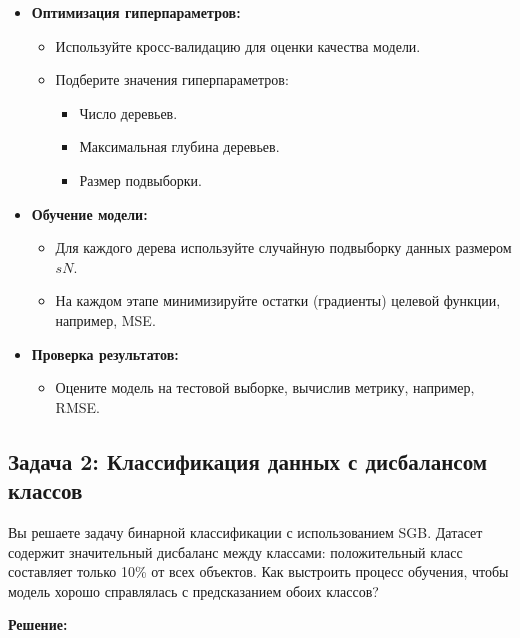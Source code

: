 \begin{itemize}
    \item \textbf{Оптимизация гиперпараметров:}
    \begin{itemize}
        \item Используйте кросс-валидацию для оценки качества модели.
        \item Подберите значения гиперпараметров:
        \begin{itemize}
            \item Число деревьев.
            \item Максимальная глубина деревьев.
            \item Размер подвыборки.
        \end{itemize}
    \end{itemize}
    \item \textbf{Обучение модели:}
    \begin{itemize}
        \item Для каждого дерева используйте случайную подвыборку данных размером $sN$.
        \item На каждом этапе минимизируйте остатки (градиенты) целевой функции, например, MSE.
    \end{itemize}
    \item \textbf{Проверка результатов:}
    \begin{itemize}
        \item Оцените модель на тестовой выборке, вычислив метрику, например, RMSE.
    \end{itemize}
\end{itemize}

\subsection{Задача 2: Классификация данных с дисбалансом классов}

Вы решаете задачу бинарной классификации с использованием SGB. Датасет содержит значительный дисбаланс между классами: положительный класс составляет только 10\% от всех объектов. Как выстроить процесс обучения, чтобы модель хорошо справлялась с предсказанием обоих классов?

\textbf{Решение:}

